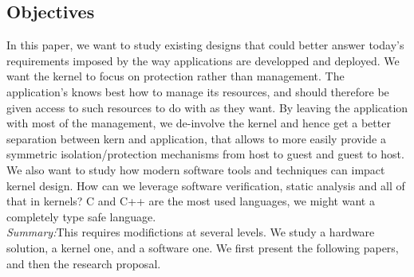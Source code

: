 \subsection{Objectives}
 In this paper, we want to study existing designs that could better answer today's requirements imposed by the way applications are developped and deployed.
 We want the kernel to focus on protection rather than management.
 The application's knows best how to manage its resources, and should therefore be given access to such resources to do with as they want.
 By leaving the application with most of the management, we de-involve the kernel and hence get a better separation between kern and application, that allows to more easily provide a symmetric isolation/protection mechanisms from host to guest and guest to host.
 We also want to study how modern software tools and techniques can impact kernel design.
 How can we leverage software verification, static analysis and all of that in kernels? 
 C and C++ are the most used languages, we might want a completely type safe language.\\

 \textit{Summary:}This requires modifictions at several levels.
 We study a hardware solution, a kernel one, and a software one.
 We first present the following papers, and then the research proposal.


 
